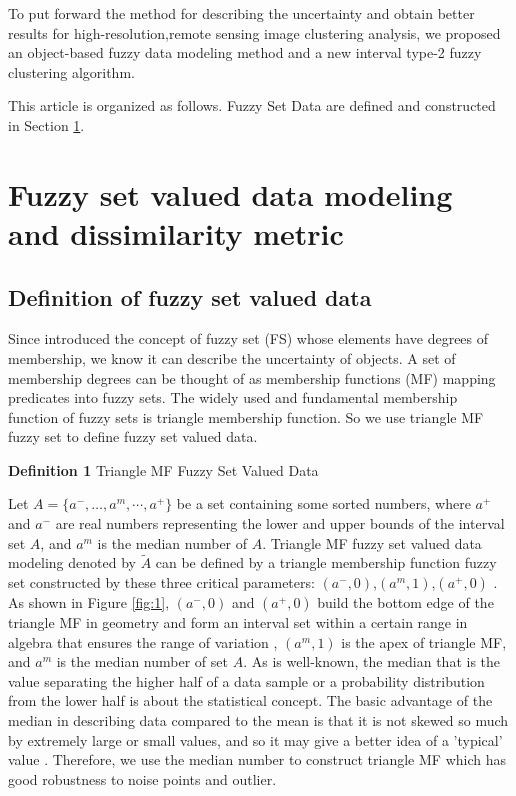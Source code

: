\documentclass[preprint,12pt,authoryear]{elsarticle}
\begin{document}
To put forward the method for describing the uncertainty and obtain better results for high-resolution,remote sensing image clustering analysis, we proposed an object-based fuzzy data modeling method and a new interval type-2 fuzzy clustering algorithm.

This article is organized as follows. Fuzzy Set Data are defined  and constructed in Section \ref{sec:2}.

\section{Fuzzy set valued data modeling and dissimilarity metric}
\label{sec:2}

\subsection{Definition of fuzzy set valued data}
Since \cite{zadeh1965fuzzy} introduced the concept of fuzzy set (FS) whose elements have degrees of membership, we know it can describe the uncertainty of objects. A set of membership degrees can be thought of as membership functions (MF) mapping predicates into fuzzy sets. The widely used and fundamental membership function of fuzzy sets is triangle membership function. So we use triangle MF fuzzy set to define fuzzy set valued data.

\textbf{Definition 1} Triangle MF Fuzzy Set Valued Data

Let $A= \lbrace a^-,\dots,a^m,\cdots,a^+ \rbrace$ be a set containing some sorted numbers, where $a^+$ and $a^-$ are real numbers representing the lower and upper bounds of the interval  set $A$, and $a^m$ is the median number of $A$. Triangle MF fuzzy set valued data modeling denoted by $\tilde{A}$ can be defined by a triangle membership function fuzzy set constructed by these three critical parameters: $(a^-,0)$,$(a^m,1)$,$(a^+,0)$ . As shown in Figure \ref{fig:1}, $(a^-,0)$ and $(a^+,0)$ build the bottom edge of the triangle MF in geometry and form an interval set within a certain range in algebra that ensures the range of variation \citep{moore1966interval}, $(a^m,1)$ is the apex of triangle MF, and $a^m$ is the median number of set $A$. As is well-known, the median that is the value separating the higher half of a data sample or a probability distribution from the lower half is about the statistical concept. The basic advantage of the median in describing data compared to the mean is that it is not skewed so much by extremely large or small values, and so it may give a better idea of a 'typical' value \citep{bissell1994statistical}. Therefore, we use the median number to construct triangle MF which has good robustness to noise points and outlier.
\end{document}
